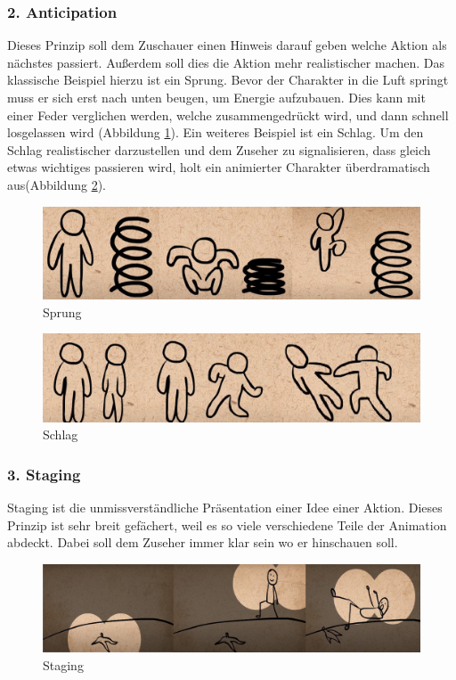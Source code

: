 \subsubsection{2. Anticipation}
Dieses Prinzip soll dem Zuschauer einen Hinweis darauf geben welche Aktion als nächstes passiert. Außerdem soll dies die Aktion mehr realistischer machen.
Das klassische Beispiel hierzu ist ein Sprung. Bevor der Charakter in die Luft springt muss er sich erst nach unten beugen, um Energie aufzubauen. Dies kann mit einer Feder verglichen werden, welche zusammengedrückt wird, und dann schnell losgelassen wird (Abbildung \ref{fig:tech:Spring}).
Ein weiteres Beispiel ist ein Schlag. Um den Schlag realistischer darzustellen und dem Zuseher zu signalisieren, dass gleich etwas wichtiges passieren wird, holt ein animierter Charakter überdramatisch aus(Abbildung \ref{fig:tech:Punch}).
\begin{figure}[H]
    \centering
    \includegraphics[scale=0.5]{pics/Spring.png}
    \caption{Sprung}
    \label{fig:tech:Spring}
\end{figure}
\begin{figure}[H]
    \centering
    \includegraphics[scale=0.5]{pics/Punch.png}
    \caption{Schlag}
    \label{fig:tech:Punch}
\end{figure}

\subsubsection{3. Staging}
Staging ist die unmissverständliche Präsentation einer Idee einer Aktion. Dieses Prinzip ist sehr breit gefächert, weil es so viele verschiedene
Teile der Animation abdeckt. Dabei soll dem Zuseher immer klar sein wo er hinschauen soll.
\begin{figure}[H]
    \centering
    \includegraphics[scale=0.2]{pics/Staging.png}
    \caption{Staging}
    \label{fig:tech:Staging}
\end{figure}

